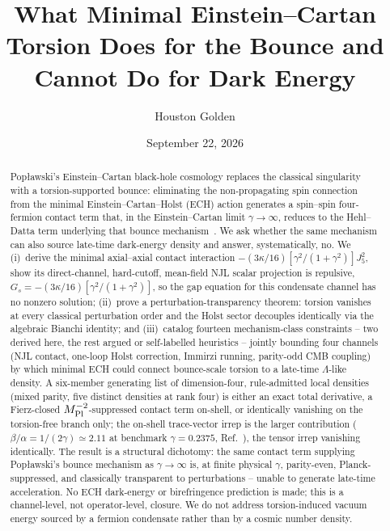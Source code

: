 \documentclass[aps,prd,twocolumn,superscriptaddress,preprintnumbers,nofootinbib,longbibliography,floatfix]{revtex4-2}
\newcommand{\MPl}{M_{\rm Pl}}
\newcommand{\paperTimestamp}{September 22, 2026}
\begin{document}
\title{What Minimal Einstein--Cartan Torsion Does for the Bounce and Cannot
Do for Dark Energy}

\author{Houston Golden}

\date{\paperTimestamp}

\begin{abstract}
Pop{\l}awski's Einstein--Cartan black-hole cosmology replaces the classical
singularity with a torsion-supported bounce: eliminating the
non-propagating spin connection from the minimal Einstein--Cartan--Holst
(ECH) action generates a spin--spin four-fermion contact term that, in
the Einstein--Cartan limit $\gamma\to\infty$, reduces to the Hehl--Datta
term underlying that bounce
mechanism~\cite{HehlDattaNJL1971,Poplawski2010,Poplawski2011}. We ask
whether the same mechanism can also source late-time dark-energy density
and answer, systematically, no. We (i)~derive the
minimal axial--axial contact interaction
$-(3\kappa/16)[\gamma^2/(1+\gamma^2)]J_5^2$, show its direct-channel,
hard-cutoff, mean-field NJL scalar projection is repulsive,
$G_s=-(3\kappa/16)[\gamma^2/(1+\gamma^2)]$, so the gap equation for this
condensate channel has no nonzero solution;
(ii)~prove a perturbation-transparency theorem: torsion vanishes at every
classical perturbation order and the Holst sector decouples identically
via the algebraic Bianchi identity; and
(iii)~catalog fourteen mechanism-class constraints -- two derived here,
the rest argued or self-labelled heuristics -- jointly bounding four
channels (NJL contact, one-loop Holst correction, Immirzi running,
parity-odd CMB coupling) by which minimal ECH could connect bounce-scale
torsion to a late-time $\Lambda$-like density. A six-member generating list of
dimension-four, rule-admitted local densities (mixed
parity, five distinct densities at rank four) is either an exact total
derivative, a Fierz-closed
$\MPl^{-2}$-suppressed contact term on-shell, or identically vanishing on
the torsion-free branch only;
the on-shell trace-vector irrep is the larger contribution
($\beta/\alpha=1/(2\gamma)\simeq2.11$ at benchmark $\gamma=0.2375$,
Ref.~\cite{Ashtekar2011}), the tensor irrep vanishing identically. The
result is a structural dichotomy: the same contact term supplying
Pop{\l}awski's bounce mechanism as $\gamma\to\infty$ is, at finite
physical $\gamma$, parity-even, Planck-suppressed, and classically
transparent to perturbations -- unable to generate late-time
acceleration. No ECH dark-energy or birefringence prediction is made;
this is a channel-level, not operator-level, closure. We do not address
torsion-induced vacuum energy sourced by a fermion condensate rather than
by a cosmic number density.
\end{abstract}
\end{document}
